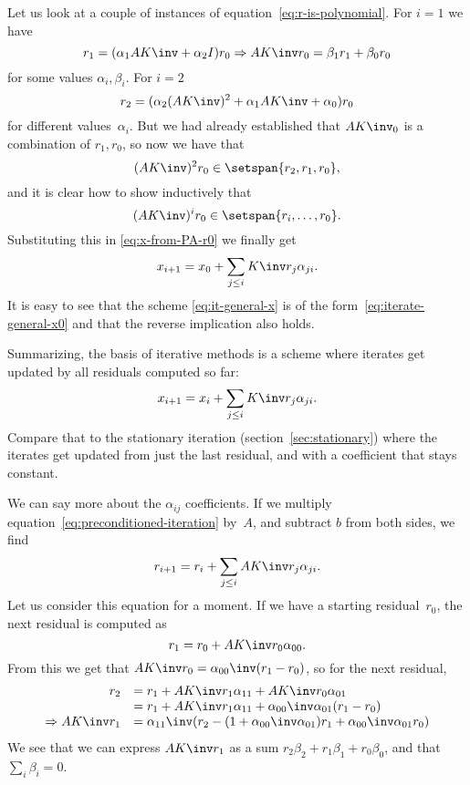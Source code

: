 Let us look at a couple of instances of
equation~\eqref{eq:r-is-polynomial}. For $i=1$ we have
\[
  r_1 = (\alpha_1AK\inv+\alpha_2I)r_0 \Rightarrow 
  AK\inv r_0 = \beta_1r_1+\beta_0r_0
\]
for some values $\alpha_i,\beta_i$. For $i=2$
\[ r_2 = (\alpha_2(AK\inv )^2+\alpha_1AK\inv +\alpha_0)r_0 \]
for different values~$\alpha_i$. But we had already established that
$AK\inv_0$ is a combination of $r_1,r_0$, so now we have that 
\[ (AK\inv)^2r_0\in \setspan{r_2,r_1,r_0}, \]
and it is clear how to show inductively that 
\begin{equation}
  (AK\inv)^ir_0\in\setspan{r_i,\ldots,r_0}.
\end{equation}
Substituting this in \eqref{eq:x-from-PA-r0} we finally get
\begin{equation}
  x_{i+1} = x_0 +\sum_{j\leq i} K\inv r_j\alpha_{ji}.
  \label{eq:iterate-general-x0}
\end{equation}
It is easy to see that the scheme \eqref{eq:it-general-x} is of the
form~\eqref{eq:iterate-general-x0} and
that the reverse implication also holds.

Summarizing, the basis of iterative methods is a scheme where
iterates get updated by all residuals computed so far:
\begin{equation}
  x_{i+1} = x_i+\sum_{j\leq i}K\inv r_j\alpha_{ji}.
  \label{eq:preconditioned-iteration}
\end{equation}
Compare that to the stationary iteration
(section~\ref{sec:stationary}) where the iterates get updated from
just the last residual, and with a coefficient that stays constant.

We can say more about the $\alpha_{ij}$ coefficients.
If we multiply equation~\eqref{eq:preconditioned-iteration} by~$A$,
and subtract $b$ from both sides,
we find
\begin{equation}
  r_{i+1} = r_i+\sum_{j\leq i}AK\inv r_j\alpha_{ji}.
  \label{eq:general-r-update}
\end{equation}
Let us consider this equation for a moment. If we have a starting
residual~$r_0$, the next residual is computed as
\[ r_1=r_0+AK\inv r_0\alpha_{00}. \]
From this we get that $AK\inv r_0 = \alpha_{00}\inv(r_1-r_0)$, so
for the next residual,
\[
\begin{array}{rl}
  r_2&=r_1+AK\inv r_1\alpha_{11}+AK\inv r_0\alpha_{01}\\
  &=r_1+AK\inv r_1\alpha_{11}+\alpha_{00}\inv\alpha_{01}(r_1-r_0)\\
  \Rightarrow AK\inv r_1&=\alpha_{11}\inv
  (r_2-(1+\alpha_{00}\inv\alpha_{01})r_1+\alpha_{00}\inv\alpha_{01}r_0)
\end{array}
\]
We see that we can express $AK\inv r_1$ as a sum
$r_2\beta_2+r_1\beta_1+r_0\beta_0$, and that $\sum_i\beta_i=0$. 


